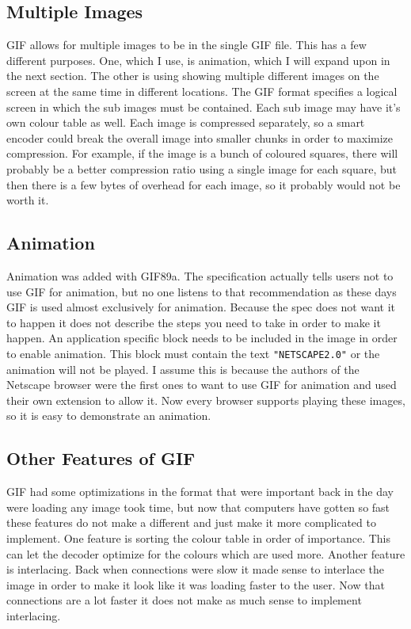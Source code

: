 \documentclass[11pt]{article} %
\begin{document}
\subsection{Multiple Images}
GIF allows for multiple images to be in the single GIF file. This has a few different purposes. One, which I use, is animation, which I will expand upon in the next section. The other is using showing multiple different images on the screen at the same time in different locations. The GIF format specifies a logical screen in which the sub images must be contained. Each sub image may have it's own colour table as well. Each image is compressed separately, so a smart encoder could break the overall image into smaller chunks in order to maximize compression. For example, if the image is a bunch of coloured squares, there will probably be a better compression ratio using a single image for each square, but then there is a few bytes of overhead for each image, so it probably would not be worth it. 
\subsection{Animation}
Animation was added with GIF89a. The specification actually tells users not to use GIF for animation, but no one listens to that recommendation as these days GIF is used almost exclusively for animation. Because the spec does not want it to happen it does not describe the steps you need to take in order to make it happen. An application specific block needs to be included in the image in order to enable animation. This block must contain the text \texttt{"NETSCAPE2.0"} or the animation will not be played. I assume this is because the authors of the Netscape browser were the first ones to want to use GIF for animation and used their own extension to allow it. Now every browser supports playing these images, so it is easy to demonstrate an animation. 
\subsection{Other Features of GIF}
GIF had some optimizations in the format that were important back in the day were loading any image took time, but now that computers have gotten so fast these features do not make a different and just make it more complicated to implement. One feature is sorting the colour table in order of importance. This can let the decoder optimize for the colours which are used more. Another feature is interlacing. Back when connections were slow it made sense to interlace the image in order to make it look like it was loading faster to the user. Now that connections are a lot faster it does not make as much sense to implement interlacing.
\end{document}
